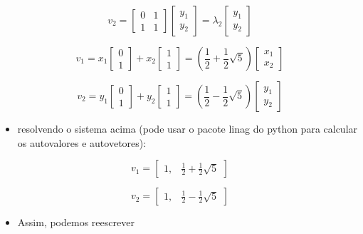 \documentclass[
  letterpaper,
  DIV=11,
  numbers=noendperiod]{scrartcl}
\providecommand{\tightlist}{%
  \setlength{\itemsep}{0pt}\setlength{\parskip}{0pt}}\usepackage{longtable,booktabs,array}
\begin{document}
\begin{tcolorbox}
\[v_2 = \begin{bmatrix}0 & 1 \\1 & 1\end{bmatrix} \begin{bmatrix}y_1 \\ y_2\end{bmatrix} = \lambda_2\begin{bmatrix}y_1 \\ y_2\end{bmatrix}\]

\[v_1 = x_1\begin{bmatrix}0 \\ 1\end{bmatrix} + x_2 \begin{bmatrix}1 \\ 1\end{bmatrix} = \left(\frac{1}{2} + \frac{1}{2}\sqrt{5}\right)\begin{bmatrix}x_1 \\ x_2\end{bmatrix}\]

\[v_2 = y_1\begin{bmatrix}0 \\ 1\end{bmatrix} + y_2 \begin{bmatrix}1 \\ 1\end{bmatrix} = \left(\frac{1}{2} - \frac{1}{2}\sqrt{5}\right)\begin{bmatrix}y_1 \\ y_2\end{bmatrix}\]

\begin{itemize}
\tightlist
\item
  resolvendo o sistema acima (pode usar o pacote linag do python para
  calcular os autovalores e autovetores):
\end{itemize}

\[ v_1 = \begin{bmatrix}1, & \frac{1}{2} + \frac{1}{2}\sqrt{5}\end{bmatrix}\]

\[ v_2 = \begin{bmatrix}1, & \frac{1}{2} - \frac{1}{2}\sqrt{5}\end{bmatrix}\]

\begin{itemize}
\tightlist
\item
  Assim, podemos reescrever
\end{itemize}


\end{tcolorbox}
\end{document}

